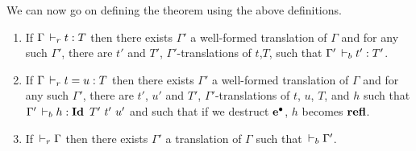 \documentclass[a4paper,english]{lipics-utf8x}
\begin{document}
  We can now go on defining the theorem using the above definitions.

  \begin{theorem}[Translation]
    \label{thm:transl}
    \leavevmode
    \begin{enumerate}
      \item If $\Gamma \,\vdash_r t : T$ then there exists $\Gamma'$ a well-formed
      translation of $\Gamma$ and for any such $\Gamma'$, there are $t'$ and
      $T'$, $\Gamma'$-translations of $t$,$T$,
      such that $\Gamma' \,\vdash_b t' : T'$.
      \item If $\Gamma \,\vdash_r t = u : T$ then there exists $\Gamma'$ a
      well-formed translation of $\Gamma$ and for any such $\Gamma'$, there are
      $t'$, $u'$ and $T'$, $\Gamma'$-translations of $t$, $u$, $T$, and $h$ such
      that $\Gamma' \derb h : \Id T'\ t'\ u'$ and such that if we destruct
      $\operatorname{\operatorname{\mathbf{e}}^\bullet}$, $h$ becomes $\operatorname{\mathbf{refl}}$.
      \item If $\,\vdash_r \Gamma$ then there exists $\Gamma'$ a translation of
      $\Gamma$ such that $\,\vdash_b \Gamma'$.
    \end{enumerate}
  \end{theorem}
\end{document}
